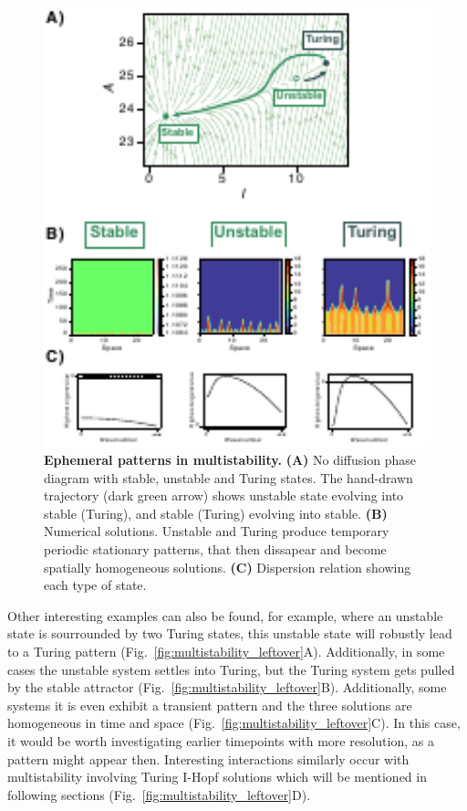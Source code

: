 \begin{figure}[H] %
    \centering
    \begin{adjustbox}{center}
        \includegraphics[width=1\textwidth]{chapters/Chapter 1/multistability2} %
    \end{adjustbox}
    \caption{\textbf{Ephemeral patterns in multistability.} \textbf{(A)} No diffusion phase diagram with stable, unstable and Turing states. The hand-drawn trajectory (dark green arrow) shows unstable state evolving into stable (Turing), and stable (Turing) evolving into stable. \textbf{(B)} Numerical solutions. Unstable and Turing produce temporary periodic stationary patterns, that then dissapear and become spatially homogeneous solutions. \textbf{(C)} Dispersion relation showing each type of state.}
    \label{fig:multistability2} %
\end{figure}

Other interesting examples can also be found, for example, where an unstable state is sourrounded by two Turing states, this unstable state will robustly lead to a Turing pattern (Fig.~\ref{fig:multistability_leftover}A).
Additionally, in some cases the unstable system settles into Turing, but the Turing system gets pulled by the stable attractor (Fig.~\ref{fig:multistability_leftover}B). Additionally, some systems it is even exhibit a transient pattern and the three solutions are homogeneous in time and space (Fig.~\ref{fig:multistability_leftover}C).
In this case, it would be worth investigating earlier timepoints with more resolution, as a pattern might appear then.
Interesting interactions similarly occur with multistability involving Turing I-Hopf solutions which will be mentioned in following sections (Fig.~\ref{fig:multistability_leftover}D).


